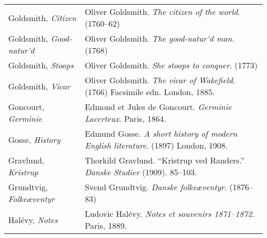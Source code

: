 \begin{longtable}{p{} p{}}
Goldsmith, \textit{Citizen} & Oliver Goldsmith. \textit{The citizen of the world}. (1760--62) \\
\raggedright {Goldsmith, \textit{Good-natur'd}} & Oliver Goldsmith. \textit{The good-natur'd man}. (1768) \\
Goldsmith, \textit{Stoops} & Oliver Goldsmith. \textit{She stoops to conquer}. (1773) \\
Goldsmith, \textit{Vicar} & Oliver Goldsmith. \textit{The vicar of Wakefield}. (1766) Facsimile edn. London, 1885. \\

Goncourt, \textit{Germinie} & Edmond et Jules de Goncourt. \textit{Germinie Lacerteux}. Paris, 1864. \\ %

Gosse, \textit{History} & Edmund Gosse. \textit{A short history of modern English literature}. (1897) London, 1908. \\

Gravlund, \textit{Kristrup} & Thorkild Gravlund. ``Kristrup ved Randers.'' \textit{Danske Studier} (1909). 85--103. \\ %

\raggedright {Grundtvig, \textit{Folkeæventyr}} & Svend Grundtvig. \textit{Danske folkeæventyr}. (1876–83) \\
%

Halévy, \textit{Notes} & Ludovic Halévy. \textit{Notes et souvenirs 1871--1872}. Paris, 1889. \\
%


\end{longtable}
